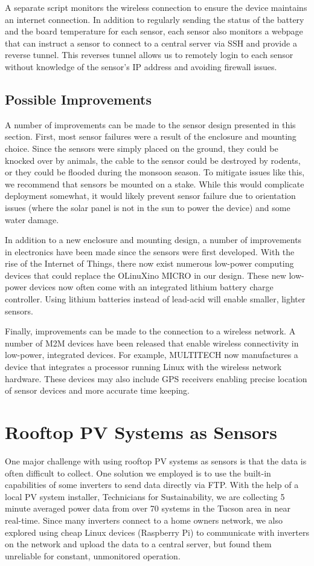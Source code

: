 A separate script monitors the wireless connection to ensure the
device maintains an internet connection.
In addition to regularly sending the status of the battery and the
board temperature for each sensor, each sensor also monitors a webpage
that can instruct a sensor to connect to a central server via SSH and
provide a reverse tunnel.
This reverses tunnel allows us to remotely login to each sensor without
knowledge of the sensor's IP address and avoiding firewall issues.

\subsection{Possible Improvements}
\label{sec:sensor_improvements}
A number of improvements can be made to the sensor design presented in
this section.
First, most sensor failures were a result of the enclosure and
mounting choice.
Since the sensors were simply placed on the ground, they could be
knocked over by animals, the cable to the sensor could be destroyed by
rodents, or they could be flooded during the monsoon season.
To mitigate issues like this, we recommend that sensors be mounted on
a stake.
While this would complicate deployment somewhat, it would likely
prevent sensor failure due to orientation issues (where the solar
panel is not in the sun to power the device) and some water damage.

In addition to a new enclosure and mounting design, a number of
improvements in electronics have been made since the sensors were first
developed.
With the rise of the Internet of Things, there now exist numerous
low-power computing devices that could replace the OLinuXino MICRO in
our design.
These new low-power devices now often come with an integrated lithium
battery charge controller.
Using lithium batteries instead of lead-acid will enable smaller,
lighter sensors.

Finally, improvements can be made to the connection to a wireless
network.
A number of M2M devices have been released that enable wireless
connectivity in low-power, integrated devices.
For example, MULTITECH now manufactures a device that integrates a
processor running Linux with the wireless network hardware.
These devices may also include GPS receivers enabling precise location
of sensor devices and more accurate time keeping.

\section{Rooftop PV Systems as Sensors}
\label{sec:pv_sensors}
One major challenge with using rooftop PV systems as sensors is that
the data is often difficult to collect.
One solution we employed is to use the built-in capabilities of some
inverters to send data directly via FTP.
With the help of a local PV system installer, Technicians for
Sustainability, we are collecting 5 minute averaged power data from
over 70 systems in the Tucson area in near real-time.
Since many inverters connect to a home owners network, we also
explored using cheap Linux devices (Raspberry Pi) to communicate with
inverters on the network and upload the data to a central server, but
found them unreliable for constant, unmonitored operation.

